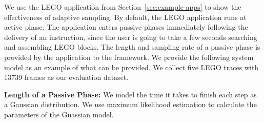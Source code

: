 We use the LEGO application from Section~\ref{sec:example-apps} to show the
effectiveness of adaptive sampling. By default, the LEGO application runs at
active phase. The application enters passive phases immediately following the
delivery of an instruction, since the user is going to take a few seconds
searching and assembling LEGO blocks. The length and sampling rate of a passive
phase is provided by the application to the framework. We provide the following
system model as an example of what can be provided. We collect five LEGO traces
with 13739 frames as our evaluation dataset.

\textbf{Length of a Passive Phase: }
We model the time it takes to finish each step as a Gaussian distribution. We
use maximum likelihood estimation to calculate the parameters of the Guassian
model.

